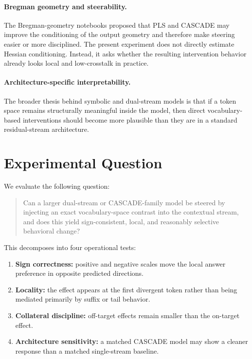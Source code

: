 \documentclass[11pt]{article}
\begin{document}
\paragraph{Bregman geometry and steerability.}
The Bregman-geometry notebooks proposed that PLS and CASCADE may improve the
conditioning of the output geometry and therefore make steering easier or more
disciplined. The present experiment does not directly estimate Hessian
conditioning. Instead, it asks whether the resulting intervention behavior
already looks local and low-crosstalk in practice.

\paragraph{Architecture-specific interpretability.}
The broader thesis behind symbolic and dual-stream models is that if a token
space remains structurally meaningful inside the model, then direct
vocabulary-based interventions should become more plausible than they are in a
standard residual-stream architecture.

\section{Experimental Question}

We evaluate the following question:

\begin{quote}
Can a larger dual-stream or CASCADE-family model be steered by injecting an
exact vocabulary-space contrast into the contextual stream, and does this yield
sign-consistent, local, and reasonably selective behavioral change?
\end{quote}

This decomposes into four operational tests:

\begin{enumerate}[leftmargin=1.5em]
\item \textbf{Sign correctness:} positive and negative scales move the local
answer preference in opposite predicted directions.
\item \textbf{Locality:} the effect appears at the first divergent token rather
than being mediated primarily by suffix or tail behavior.
\item \textbf{Collateral discipline:} off-target effects remain smaller than
the on-target effect.
\item \textbf{Architecture sensitivity:} a matched CASCADE model may show a
cleaner response than a matched single-stream baseline.
\end{enumerate}
\end{document}
